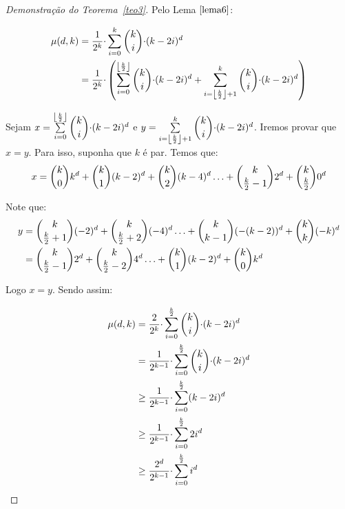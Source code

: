 \begin{proof}[Demonstração do Teorema~\ref{teo3}]
	Pelo Lema $\ref{lema6}$:
	
	\begin{align}
		\begin{split} 
			\mu(d, k) &= \dfrac{1}{2^k} {\cdot} \sum\limits_{i = 0}^{k}\escolhe{k}{i} {\cdot} (k - 2i)^{d} \\
			&= \dfrac{1}{2^k} {\cdot} \left(  \sum\limits_{i = 0}^{ \blfloor \frac{k}{2} \brfloor  }\escolhe{k}{i} {\cdot} (k - 2i)^{d} +   \sum\limits_{i = \blfloor \frac{k}{2} \brfloor + 1  }^{k}\escolhe{k}{i} {\cdot} (k - 2i)^{d} \right)
		\end{split} 
	\end{align}
	
	Sejam $x = \sum\limits_{i = 0}^{ \blfloor \frac{k}{2} \brfloor  }\escolhe{k}{i} {\cdot} (k - 2i)^{d} $ e $y = \sum\limits_{i = \blfloor \frac{k}{2} \brfloor + 1  }^{k}\escolhe{k}{i} {\cdot} (k - 2i)^{d}$. Iremos provar que $x=y$. Para isso, suponha que $k$ é par. Temos que: 
	\begin{align}
		\begin{split}  
			x = \escolhe{k}{0}k^{d} + \escolhe{k}{1}(k-2)^{d} + \escolhe{k}{2}(k-4)^{d} \ldots + \escolhe{k}{\frac{k}{2} - 1}2^{d} + \escolhe{k}{\frac{k}{2}}0^{d}
		\end{split} 
	\end{align}
	
	Note que: 
	\begin{align}
		\begin{split}  
			y &= \escolhe{k}{\frac{k}{2} + 1}(-2)^{d} + \escolhe{k}{\frac{k}{2} + 2}(-4)^{d} \ldots + \escolhe{k}{k-1}(-(k-2))^{d} + \escolhe{k}{k}(-k)^{d} \\
			&= \escolhe{k}{\frac{k}{2} - 1}2^{d} + \escolhe{k}{\frac{k}{2} - 2}4^{d} \ldots + \escolhe{k}{1}(k-2)^{d} + \escolhe{k}{0}k^{d}
		\end{split} 
	\end{align}
	
	Logo $x = y$. Sendo assim:
	
	\begin{align}
		\begin{split}
			\label{l6_4} 
			\mu(d, k) &= \dfrac{2}{2^k} {\cdot}  \sum\limits_{i = 0}^{  \frac{k}{2}   }\escolhe{k}{i} {\cdot} (k - 2i)^{d}  \\
			&= \dfrac{1}{2^{k-1}} {\cdot}  \sum\limits_{i = 0}^{  \frac{k}{2}   }\escolhe{k}{i} {\cdot} (k - 2i)^{d} \\
			&\geq \dfrac{1}{2^{k-1}} {\cdot}  \sum\limits_{i = 0}^{  \frac{k}{2}   }(k - 2i)^{d} \\
			&\geq \dfrac{1}{2^{k-1}} {\cdot}  \sum\limits_{i = 0}^{  \frac{k}{2}   }2i^{d} \\
			&\geq \dfrac{2^{d}}{2^{k-1}} {\cdot}  \sum\limits_{i = 0}^{  \frac{k}{2}   }i^{d}
		\end{split} 
	\end{align}
	

\end{proof}
